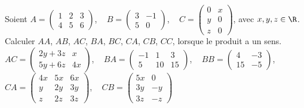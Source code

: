 \documentclass[11pt]{article}
\begin{document}
\begin{ex}{}{}
    Soient $A=\begin{pmatrix}
        1 & 2 & 3 \\
        4 & 5 & 6
    \end{pmatrix}$, ~ $B=\begin{pmatrix}
        3 & -1\\
        5 & 0
    \end{pmatrix}$, ~ $C=\begin{pmatrix}
        0 & x \\
        y & 0 \\
        z & 0
    \end{pmatrix}$, avec $x,y,z\in\R$.\\
    Calculer $AA$, $AB$, $AC$, $BA$, $BC$, $CA$, $CB$, $CC$, lorsque le produit a un sens.
    \tcblower
    $AC=\begin{pmatrix}
        2y+3z & x \\ 5y + 6z & 4x
    \end{pmatrix}$, ~ $BA = \begin{pmatrix}
        -1 & 1 & 3\\ 5 & 10 & 15
    \end{pmatrix}$, ~ $BB=\begin{pmatrix}
        4 & -3 \\ 15 & -5
    \end{pmatrix}$, ~ $CA=\begin{pmatrix}
        4x & 5x & 6x \\ y & 2y & 3y \\ z & 2z & 3z
    \end{pmatrix}$, ~ $CB=\begin{pmatrix}
        5x & 0\\ 3y & -y\\ 3z & -z
    \end{pmatrix}$
\end{ex}
\end{document}
